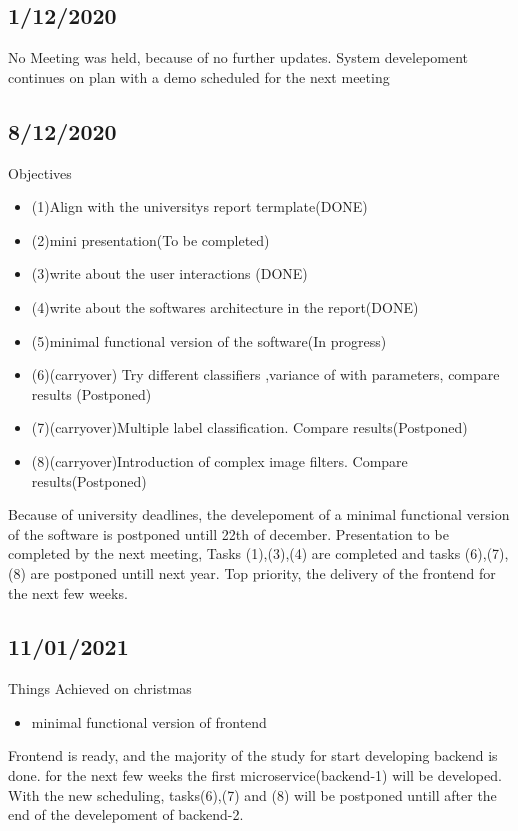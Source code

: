 \documentclass[openany]{article}
\begin{document}
		\subsection{1/12/2020}
			No Meeting was held, because of no further updates. System develepoment continues on plan
			with a demo scheduled for the next meeting
		\subsection{8/12/2020}
			Objectives
			\begin{itemize}
				\item (1)Align with the universitys report termplate(DONE)
				\item (2)mini presentation(To be completed)
				\item (3)write about the user interactions (DONE)
				\item (4)write about the softwares architecture in the report(DONE)
				\item (5)minimal functional version of the software(In progress)
				\item (6)(carryover) Try different classifiers ,variance of with parameters, compare results (Postponed)
				\item (7)(carryover)Multiple label classification. Compare results(Postponed)
				\item (8)(carryover)Introduction of complex image filters. Compare results(Postponed)
			\end{itemize}
			Because of university deadlines, the develepoment of a minimal functional version of the software is postponed untill 22th of december.
			Presentation to be completed by the next meeting, Tasks (1),(3),(4) are completed and tasks (6),(7),(8) are postponed untill next year.
			Top priority, the delivery of the frontend for the next few weeks.
			
		\subsection{11/01/2021}
			Things Achieved on christmas
			
			\begin{itemize}
				\item minimal functional version of frontend
			\end{itemize}
			Frontend is ready, and the majority of the study for start developing backend is done. for the next few weeks the first microservice(backend-1) will be developed. 
			With the new scheduling, tasks(6),(7) and (8) will be postponed untill after the end of the develepoment of backend-2.
\end{document}
